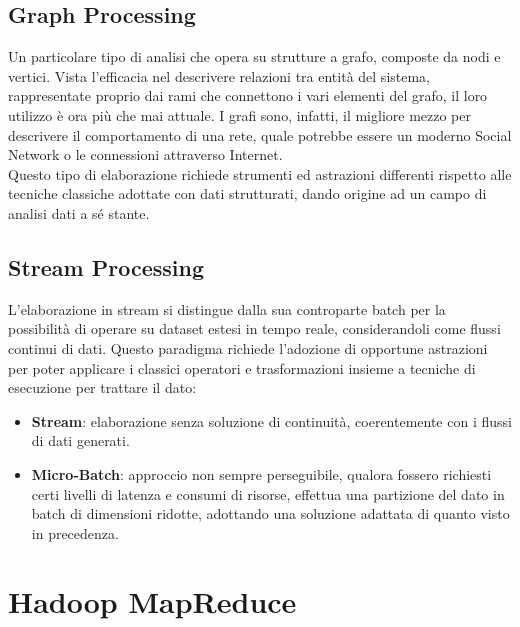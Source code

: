 \subsection{Graph Processing}
Un particolare tipo di analisi che opera su strutture a grafo, composte da nodi e vertici. Vista l'efficacia nel descrivere relazioni tra entità del sistema, rappresentate proprio dai rami che connettono i vari elementi del grafo, il loro utilizzo è ora più che mai attuale. I grafi sono, infatti, il migliore mezzo per descrivere il comportamento di una rete, quale potrebbe essere un moderno Social Network o le connessioni attraverso Internet.\\
Questo tipo di elaborazione richiede strumenti ed astrazioni differenti rispetto alle tecniche classiche adottate con dati strutturati, dando origine ad un campo di analisi dati a sé stante.

\subsection{Stream Processing}
L'elaborazione in stream si distingue dalla sua controparte batch per la possibilità di operare su dataset estesi in tempo reale, considerandoli come flussi continui di dati. Questo paradigma richiede l'adozione di opportune astrazioni per poter applicare i classici operatori e trasformazioni insieme a tecniche di esecuzione per trattare il dato:
\begin{itemize}
	\item \textbf{Stream}: elaborazione senza soluzione di continuità, coerentemente con i flussi di dati generati.
	\item \textbf{Micro-Batch}: approccio non sempre perseguibile, qualora fossero richiesti certi livelli di latenza e consumi di risorse, effettua una partizione del dato in batch di dimensioni ridotte, adottando una soluzione adattata di quanto visto in precedenza.
\end{itemize}
\pagebreak

\section{Hadoop MapReduce}

